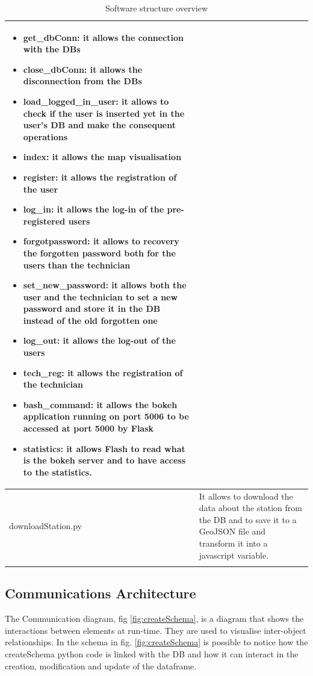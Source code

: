 \documentclass{article}
\begin{document}
\begin{longtable}[H]{|l|p{}|}
\begin{itemize}
         \item get\_dbConn: it allows the connection with the  DBs
         \item close\_dbConn: it allows the disconnection from the  DBs
         \item load\_logged\_in\_user: it allows to check if the user is inserted yet in the user’s DB and make the consequent operations
         \item index: it allows the map visualisation
         \item register: it allows the registration of the user
         \item log\_in: it allows the log-in of the pre-registered users
         \item forgotpassword: it allows to recovery the forgotten password both for the users than the technician
         \item set\_new\_password: it allows both the user and the technician to set a new password and store it in the DB instead of the old forgotten one
         \item log\_out: it allows the log-out of the users 
         \item tech\_reg: it allows the registration of the technician
         \item bash\_command: it allows the bokeh application running on port 5006 to be accessed at port 5000 by Flask
         \item statistics: it allows Flash to read what is the bokeh server and to have access to the statistics.
     \end{itemize}
     \\
    \hline
    downloadStation.py & It allows to download the data about the station from the DB and to save it to a GeoJSON file and transform it into a javascript variable. 
      \\
    \hline
\caption{Software structure overview } \\
\end{longtable}
      
\subsection{Communications Architecture}
The Communication diagram, fig \ref{fig:createSchema}, is a diagram that shows the interactions between elements at run-time. They  are used to visualise inter-object relationships.
In the schema in fig. \ref{fig:createSchema} is possible to notice how the createSchema python code is linked with the DB and how it can interact in the creation, modification and update of the dataframe.
\end{document}
